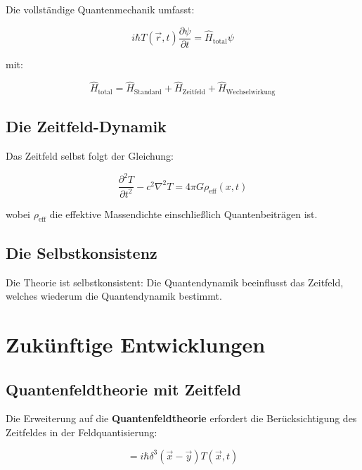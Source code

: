 \documentclass[12pt,a4paper]{report}
\begin{document}
	Die vollständige Quantenmechanik umfasst:
	
	\begin{equation}
		i\hbar T(\vec{r},t)\frac{\partial\psi}{\partial t} = \hat{H}_{\text{total}}\psi
	\end{equation}
	
	mit:
	
	\begin{equation}
		\hat{H}_{\text{total}} = \hat{H}_{\text{Standard}} + \hat{H}_{\text{Zeitfeld}} + \hat{H}_{\text{Wechselwirkung}}
	\end{equation}
	
	\subsection{Die Zeitfeld-Dynamik}
	
	Das Zeitfeld selbst folgt der Gleichung:
	
	\begin{equation}
		\frac{\partial^2 T}{\partial t^2} - c^2\nabla^2 T = 4\pi G \rho_{\text{eff}}(x,t)
	\end{equation}
	
	wobei $\rho_{\text{eff}}$ die effektive Massendichte einschließlich Quantenbeiträgen ist.
	
	\subsection{Die Selbstkonsistenz}
	
	Die Theorie ist selbstkonsistent: Die Quantendynamik beeinflusst das Zeitfeld, welches wiederum die Quantendynamik bestimmt.
	
	\section{Zukünftige Entwicklungen}
	
	\subsection{Quantenfeldtheorie mit Zeitfeld}
	
	Die Erweiterung auf die \textbf{Quantenfeldtheorie} erfordert die Berücksichtigung des Zeitfeldes in der Feldquantisierung:
	
	\begin{equation}
		[\hat{\phi}(\vec{x},t), \hat{\pi}(\vec{y},t)] = i\hbar\delta^3(\vec{x}-\vec{y})T(\vec{x},t)
	\end{equation}
	
\end{document}
